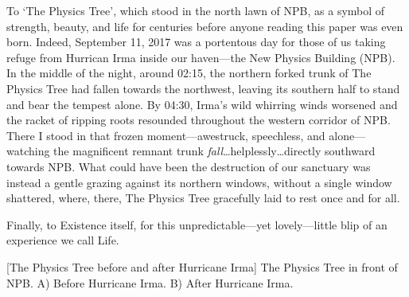 To `The Physics Tree', which stood in the north lawn of NPB, as a symbol of strength, beauty, and life for centuries before anyone reading this paper was even born.
Indeed, September 11, 2017 was a portentous day for those of us taking refuge from Hurrican Irma inside our haven---the New Physics Building (NPB).
In the middle of the night, around 02:15, the northern forked trunk of The Physics Tree had fallen towards the northwest, leaving its southern half to stand and bear the tempest alone.
By 04:30, Irma's wild whirring winds worsened and the racket of ripping roots resounded throughout the western corridor of NPB.
There I stood in that frozen moment---awestruck, speechless, and alone---watching the magnificent remnant trunk \emph{fall}\ldots helplessly\ldots directly southward towards NPB.
What could have been the destruction of our sanctuary was instead a gentle grazing against its northern windows, without a single window shattered, where, there, The Physics Tree gracefully laid to rest once and for all.

Finally, to Existence itself, for this unpredictable---yet lovely---little blip of an experience we call Life.
\begin{multiFigure}
    \centering
        [The Physics Tree before and after Hurricane Irma]
        {The Physics Tree in front of NPB.
        \;A) Before Hurricane Irma.
        \;B) After Hurricane Irma.
        }
\end{multiFigure}
